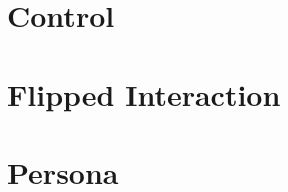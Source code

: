 \documentclass[conference]{IEEEtran}
\begin{document}


\begin{appendices}
  \clearpage
  \section{Control} \label{sec:control}
  \clearpage
  
  \clearpage
  \section{Flipped Interaction} \label{sec:flipped}
  \clearpage
  
  \clearpage
  \section{Persona} \label{sec:persona}
  \clearpage
  
\end{appendices}

\vspace{12pt}
\end{document}
